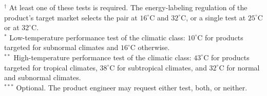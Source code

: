\documentclass[11pt]{article}
\begin{document}
\begin{table}[H]
\vspace{1mm}
\begin{minipage}{0.95\textwidth}
\footnotesize
$^{\dagger}$ At least one of these tests is required. The energy-labeling regulation of the product's target market selects the pair at \(16^\circ\mathrm{C}\) and \(32^\circ\mathrm{C}\), or a single test at \(25^\circ\mathrm{C}\) or at \(32^\circ\mathrm{C}\).\\
$^{*}$ Low-temperature performance test of the climatic class: \(10^\circ\mathrm{C}\) for products targeted for subnormal climates and \(16^\circ\mathrm{C}\) otherwise.\\
$^{**}$ High-temperature performance test of the climatic class: \(43^\circ\mathrm{C}\) for products targeted for tropical climates, \(38^\circ\mathrm{C}\) for subtropical climates, and \(32^\circ\mathrm{C}\) for normal and subnormal climates.\\
$^{***}$ Optional. The product engineer may request either test, both, or neither.
\end{minipage}
\end{table}
\end{document}
